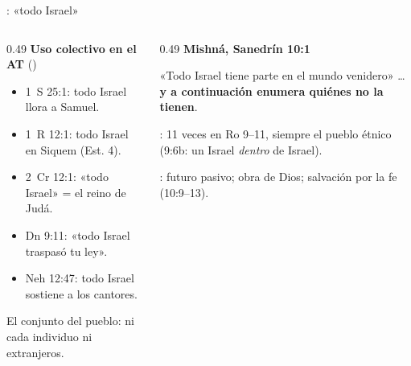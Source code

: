 \begin{frame}{: «todo Israel»}
\begin{columns}[T,onlytextwidth]
\begin{column}{0.49\textwidth}\small
\textbf{\textcolor{cafe}{Uso colectivo en el AT}} ()
\begin{itemize}
\item 1~S 25:1: todo Israel llora a Samuel.
\item 1~R 12:1: todo Israel en Siquem (Est. 4).
\item 2~Cr 12:1: «todo Israel» = el reino de Judá.
\item Dn 9:11: «todo Israel traspasó tu ley».
\item Neh 12:47: todo Israel sostiene a los cantores.
\end{itemize}
\scriptsize El conjunto del pueblo: ni cada individuo ni extranjeros.
\end{column}
\begin{column}{0.49\textwidth}\small
\textbf{\textcolor{cafe}{Mishná, Sanedrín 10:1}}\par\smallskip
{}\par\smallskip
\raggedright «Todo Israel tiene parte en el mundo venidero» \ldots{} \textbf{y a continuación enumera quiénes no la tienen}.\par\medskip
{}: 11 veces en Ro 9--11, siempre el pueblo étnico (9:6b: un Israel \emph{dentro} de Israel).\par\smallskip
{}: futuro pasivo; obra de Dios; salvación por la fe (10:9--13).
\end{column}
\end{columns}
\end{frame}

